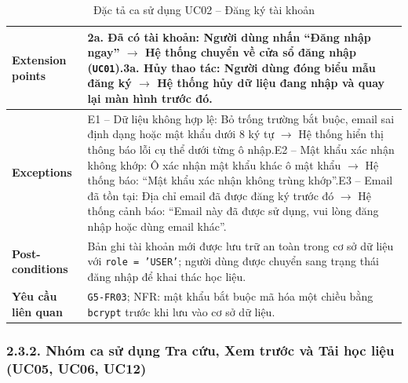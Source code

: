 \begin{table}[H]
\begin{tabularx}{\textwidth}{|p{3.5cm}|X|}
\hline
\textbf{Extension points} & 2a. Đã có tài khoản: Người dùng nhấn ``Đăng nhập ngay'' $\rightarrow$ Hệ thống chuyển về cửa sổ đăng nhập (\texttt{UC01}).\newline 3a. Hủy thao tác: Người dùng đóng biểu mẫu đăng ký $\rightarrow$ Hệ thống hủy dữ liệu đang nhập và quay lại màn hình trước đó. \\
\hline
\textbf{Exceptions} & E1 -- Dữ liệu không hợp lệ: Bỏ trống trường bắt buộc, email sai định dạng hoặc mật khẩu dưới 8 ký tự $\rightarrow$ Hệ thống hiển thị thông báo lỗi cụ thể dưới từng ô nhập.\newline E2 -- Mật khẩu xác nhận không khớp: Ô xác nhận mật khẩu khác ô mật khẩu $\rightarrow$ Hệ thống báo: ``Mật khẩu xác nhận không trùng khớp''.\newline E3 -- Email đã tồn tại: Địa chỉ email đã được đăng ký trước đó $\rightarrow$ Hệ thống cảnh báo: ``Email này đã được sử dụng, vui lòng đăng nhập hoặc dùng email khác''. \\
\hline
\textbf{Post-conditions} & Bản ghi tài khoản mới được lưu trữ an toàn trong cơ sở dữ liệu với \texttt{role = 'USER'}; người dùng được chuyển sang trạng thái đăng nhập để khai thác học liệu. \\
\hline
\textbf{Yêu cầu liên quan} & \texttt{G5-FR03}; NFR: mật khẩu bắt buộc mã hóa một chiều bằng \texttt{bcrypt} trước khi lưu vào cơ sở dữ liệu. \\
\hline
\end{tabularx}
\caption{Đặc tả ca sử dụng UC02 -- Đăng ký tài khoản}
\label{tab:uc02}
\end{table}


\subsubsection{2.3.2. Nhóm ca sử dụng Tra cứu, Xem trước và Tải học liệu (UC05, UC06, UC12)}

